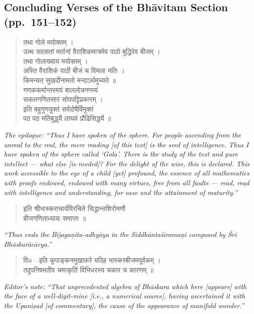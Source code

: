 \documentclass[11pt,a4paper]{article}
\newcommand{\cnote}[1]{\textcolor{notecolor}{\textit{#1}}}
\newcommand{\dev}[1]{{\devanagarifont #1}}
\newenvironment{sanskritverse}{%
  \begin{verse}
}{%
  \end{verse}
}
\begin{document}
\subsection*{Concluding Verses of the Bhāvitam Section (pp.\ 151--152)}

\begin{sanskritverse}
\dev{%
तथा गोले मयोक्तम् ।\\
उत्थ सदसतां मर्तानां वैराशिकमात्रमेव पाठो बुद्धिरेव बीजम् ।\\
तथा गोलाख्याय मयोक्तम् ।\\[0.3em]
अस्ति वैराशिकं पाठी बीजं च विमला मतिः ।\\
किमन्यत् सुखदीनामतो मन्दाऽर्थमुच्यते ॥\\[0.3em]
गणककर्मान्तरमयं बाललोचनगम्यं\\
सकलगणितसारं सोपपट्टिप्रकारम् ।\\
इति बहुगुणयुक्तं सर्वदोषैर्विमुक्तं\\
पठ पठ मतिबुद्ध्‌यै लाघवं प्रौढिसिद्ध्यै ॥}
\end{sanskritverse}

\cnote{The epilogue: ``Thus I have spoken of the sphere. For people ascending from the unreal to the real, the mere reading [of this text] is the seed of intelligence. Thus I have spoken of the sphere called `Gola'. There is the study of the text and pure intellect --- what else [is needed]? For the delight of the wise, this is declared. This work accessible to the eye of a child [yet] profound, the essence of all mathematics with proofs endowed, endowed with many virtues, free from all faults --- read, read with intelligence and understanding, for ease and the attainment of maturity.''}

\begin{sanskritverse}
\dev{%
इति श्रीभास्कराचार्यविरचिते सिद्धान्तशिरोमणौ\\
बीजगणिताध्यायः समाप्तः ॥}
\end{sanskritverse}

\cnote{``Thus ends the Bījagaṇita-adhyāya in the Siddhāntaśiromaṇi composed by Śrī Bhāskarācārya.''}

\bigskip

\begin{sanskritverse}
\dev{%
वि०—इति कूपाङ्कनमुखाकरे यदिह भास्करबीजमपूर्वकम् ।\\
तदुपनिषमतीव चमत्कृतिं विभिधरस्य चकार च कारणम् ॥}
\end{sanskritverse}

\cnote{Editor's note: ``That unprecedented algebra of Bhāskara which here [appears] with the face of a well-digit-mine [i.e., a numerical source], having ascertained it with the Upaniṣad [of commentary], the cause of the appearance of manifold wonder.''}
\end{document}
